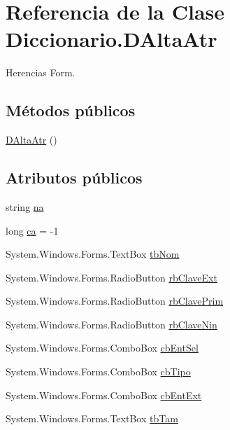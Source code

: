\hypertarget{class_diccionario_1_1_d_alta_atr}{\section{Referencia de la Clase Diccionario.\-D\-Alta\-Atr}
\label{class_diccionario_1_1_d_alta_atr}
}


Herencias Form.

\subsection*{Métodos públicos}
\begin{DoxyCompactItemize}
\item 
\hyperlink{class_diccionario_1_1_d_alta_atr_a0aef462d74c255ca2c69f00309e09aa5}{D\-Alta\-Atr} ()
\end{DoxyCompactItemize}
\subsection*{Atributos públicos}
\begin{DoxyCompactItemize}
\item 
string \hyperlink{class_diccionario_1_1_d_alta_atr_a6f63c75ec35559aeb823420993484b95}{na}
\item 
long \hyperlink{class_diccionario_1_1_d_alta_atr_aded12236e09d3cd47b585e1073ead93f}{ca} = -\/1
\item 
System.\-Windows.\-Forms.\-Text\-Box \hyperlink{class_diccionario_1_1_d_alta_atr_af7808ef47c9c529c6599866647e7cb2b}{tb\-Nom}
\item 
System.\-Windows.\-Forms.\-Radio\-Button \hyperlink{class_diccionario_1_1_d_alta_atr_a2395d4ed5ce6f1b87c44c9e426f113f7}{rb\-Clave\-Ext}
\item 
System.\-Windows.\-Forms.\-Radio\-Button \hyperlink{class_diccionario_1_1_d_alta_atr_a3244afafac8517fc34a939e2292e56d4}{rb\-Clave\-Prim}
\item 
System.\-Windows.\-Forms.\-Radio\-Button \hyperlink{class_diccionario_1_1_d_alta_atr_a9e79897c007af92baf3505b80375ae5b}{rb\-Clave\-Nin}
\item 
System.\-Windows.\-Forms.\-Combo\-Box \hyperlink{class_diccionario_1_1_d_alta_atr_aec4fecf675bd5247ef5e988bba3580ac}{cb\-Ent\-Sel}
\item 
System.\-Windows.\-Forms.\-Combo\-Box \hyperlink{class_diccionario_1_1_d_alta_atr_a066e4fc451764a57389edde6df2b5222}{cb\-Tipo}
\item 
System.\-Windows.\-Forms.\-Combo\-Box \hyperlink{class_diccionario_1_1_d_alta_atr_a03f71bd5d4e3ae81ce9948b1e53d133e}{cb\-Ent\-Ext}
\item 
System.\-Windows.\-Forms.\-Text\-Box \hyperlink{class_diccionario_1_1_d_alta_atr_a9723653c62ae5e988320eba88ba88ebe}{tb\-Tam}
\end{DoxyCompactItemize}
